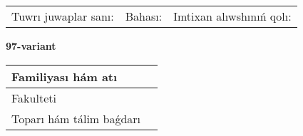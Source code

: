 \documentclass{article}
\begin{document}
\vspace{1cm}

\begin{tabular}{lll}
Tuwrı juwaplar sanı: \underline{\hspace{1.5cm}} & 
Bahası: \underline{\hspace{1.5cm}} & 
Imtixan alıwshınıń qolı: \underline{\hspace{2cm}} \\
\end{tabular}

\egroup

\newpage


\textbf{97-variant}\\

\bgroup
\def\arraystretch{1.6} %

\begin{tabular}{|m{5.7cm}|m{9.5cm}|}
\hline
Familiyası hám atı & \\
\hline
Fakulteti  & \\
\hline
Toparı hám tálim baǵdarı  & \\
\hline
\end{tabular}

\vspace{1cm}
\end{document}
